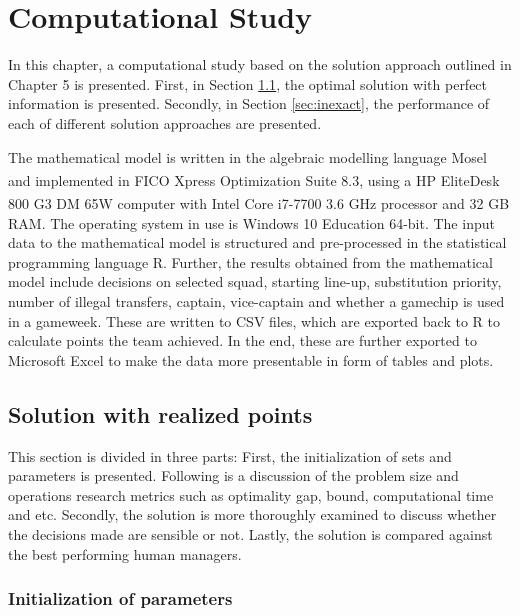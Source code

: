 
\chapter{Computational Study}


In this chapter, a computational study based on the solution approach outlined in Chapter 5 is presented. First, in Section \ref{sec:exact}, the optimal solution with perfect information is presented. Secondly, in Section \ref{sec:inexact}, the performance of each of different solution approaches are presented. 

\newpar

The mathematical model is written in the algebraic modelling language Mosel and implemented in FICO\textsuperscript {\textregistered} Xpress Optimization Suite 8.3, using a HP EliteDesk 800 G3 DM 65W computer with Intel\textsuperscript{\textregistered} Core\textsuperscript{\texttrademark} i7-7700 3.6 GHz processor and 32 GB RAM. The operating system in use is Windows 10 Education 64-bit. The input data to the mathematical model is structured and pre-processed in the statistical programming language R. Further, the results obtained from the mathematical model include decisions on selected squad, starting line-up, substitution priority, number of illegal transfers, captain, vice-captain and whether a gamechip is used in a gameweek. These are written to CSV files, which are exported back to R to calculate points the team achieved. In the end, these are further exported to Microsoft Excel to make the data more presentable in form of tables and plots. 

\section{Solution with realized points}\label{sec:exact}
This section is divided in three parts: 
First, the initialization of sets and parameters is presented. Following is a discussion of the problem size and operations research metrics such as optimality gap, bound, computational time and etc. Secondly, the solution is more thoroughly examined to discuss whether the decisions made are sensible or not. Lastly, the solution is compared against the best performing human managers. 



\subsection{Initialization of parameters}    

